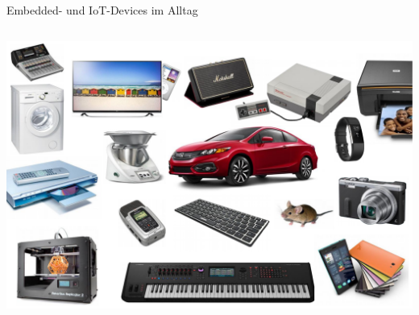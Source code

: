 \begin{frame}{Embedded- und IoT-Devices im Alltag}
    \begin{columns}
        \column{\dimexpr\paperwidth-28pt}
        \includegraphics[width=\textwidth]{1-grundlagen/img/embedded_devices}
    \end{columns}
\end{frame}


